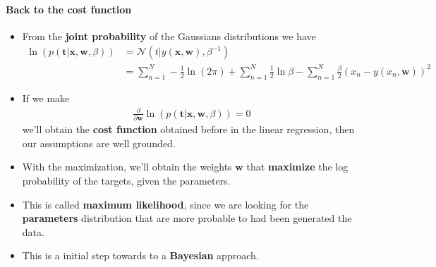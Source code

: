 \begin{frame}{\insertsubsection}
	\framesubtitle{Back to the cost function}
	\begin{itemize}
		\item From the \textcolor{UniOrange}{\textbf{joint probability}} of the Gaussians distributions we have
		\begin{align*}
				\ln \left( p( \mathbf{t}| \mathbf{x}, \mathbf{w}, \beta) \right) 
				&= \mathcal{N} \left( t | y(\mathbf{x}, \mathbf{w}), \beta^{-1} \right) \\
				&= \sum_{n=1}^N - \frac{1}{2} \ln (2 \pi) + \sum_{n=1}^N \frac{1}{2} \ln \beta - \sum_{n=1}^N \frac{\beta}{2} (x_n -  y(x_n, \mathbf{w}))^2
		\end{align*}
		\item If we make
		\begin{align*}
			\frac{\partial}{\partial \mathbf{w}}\ln \left( p( \mathbf{t}| \mathbf{x}, \mathbf{w}, \beta) \right) = 0
		\end{align*}
		we'll obtain the \textcolor{UniOrange}{\textbf{cost function}} obtained before in the linear regression, then our assumptions are well grounded.
		\item With the maximization, we'll obtain the weights $\mathbf{w}$ that \textcolor{UniOrange}{\textbf{maximize}} the log probability of the targets, given the parameters.
		\item This is called \textcolor{UniOrange}{\textbf{maximum likelihood}}, since we are looking for the \textcolor{UniOrange}{\textbf{parameters}} distribution that are more probable to had been generated the data.
		\item This is a initial step towards to a \textcolor{UniOrange}{\textbf{Bayesian}} approach.
	\end{itemize}
\end{frame}